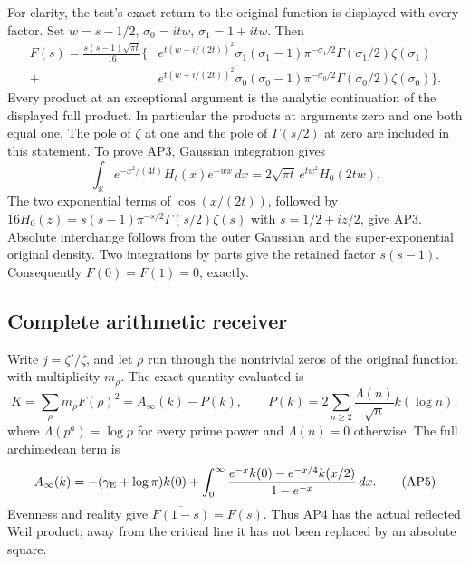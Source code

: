For clarity, the test's exact return to the original function is
displayed with every factor. Set \(w=s-1/2\),
\(\sigma_0=itw\), \(\sigma_1=1+itw\). Then
\[
\begin{split}
 F(s)=\frac{s(s-1)\sqrt{\pi t}}{16}\bigl\{&
 e^{t(w-i/(2t))^2}\sigma_1(\sigma_1-1)\pi^{-\sigma_1/2}
       \Gamma(\sigma_1/2)\zeta(\sigma_1)\\
 {}+{}&e^{t(w+i/(2t))^2}\sigma_0(\sigma_0-1)\pi^{-\sigma_0/2}
       \Gamma(\sigma_0/2)\zeta(\sigma_0)\bigr\}.
\end{split}\tag{AP3}
\]
Every product at an exceptional argument is the analytic continuation
of the displayed full product. In particular the products at arguments
zero and one both equal one. The pole of \(\zeta\) at one and
the pole of \(\Gamma(s/2)\) at zero are included in this statement.
To prove AP3, Gaussian integration gives
\[
 \int_{\mathbb R}e^{-x^2/(4t)}H_t(x)e^{-wx}\,dx
 =2\sqrt{\pi t}\,e^{tw^2}H_0(2tw).
\]
The two exponential terms of \(\cos(x/(2t))\), followed by
\(16H_0(z)=s(s-1)\pi^{-s/2}\Gamma(s/2)\zeta(s)\) with
\(s=1/2+iz/2\), give AP3. Absolute interchange follows from the
outer Gaussian and the super-exponential original density. Two
integrations by parts give the retained factor \(s(s-1)\).
Consequently \(F(0)=F(1)=0\), exactly.

\subsection{Complete arithmetic receiver}
Write \(j=\zeta'/\zeta\), and let \(\rho\) run through the
nontrivial zeros of the original function with multiplicity \(m_\rho\).
The exact quantity evaluated is
\[
 K=\sum_\rho m_\rho F(\rho)^2
   =A_\infty(k)-P(k),\qquad
 P(k)=2\sum_{n\ge2}\frac{\Lambda(n)}{\sqrt n}k(\log n),
 \tag{AP4}
\]
where \(\Lambda(p^a)=\log p\) for every prime power and
\(\Lambda(n)=0\) otherwise. The full archimedean term is
\[
 A_\infty(k)=-(\gamma_{\rm E}+\log\pi)k(0)+
 \int_0^\infty\frac{e^{-x}k(0)-e^{-x/4}k(x/2)}{1-e^{-x}}\,dx.
 \tag{AP5}
\]
Evenness and reality give
\(\overline{F(1-\overline s)}=F(s)\). Thus AP4 has the actual
reflected Weil product; away from the critical line it has not been
replaced by an absolute square.

